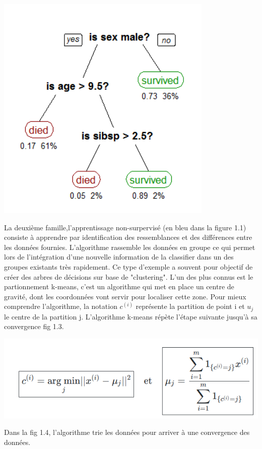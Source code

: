 \documentclass[12pt,a4paper]{report}
\begin{document}
\begin{center}
	\includegraphics[scale=0.5]{ML_superviser}
	\label{fig1}
\end{center}


La deuxième famille,l'apprentissage non-surpervisé (en bleu dans la figure 1.1) consiste à apprendre par identification des ressemblances et des différences entre les données fournies. L'algorithme rassemble les données en groupe ce qui permet lors de l'intégration d'une nouvelle information de la classifier dans un des groupes existants très rapidement. Ce type d'exemple a souvent pour objectif de créer des arbres de décisions sur base de "clustering".
L'un des plus connus est le partionnement k-means, c'est un algorithme qui met en place un centre de gravité, dont les coordonnées vont servir pour localiser cette zone. Pour mieux comprendre l'algorithme, la notation $c^{(i)}$ représente la partition de point i et $u_j$ le centre de la partition j. L'algorithme k-means répète l'étape suivante jusqu'à sa convergence fig 1.3.\\

\begin{center}
	\includegraphics[scale=0.5]{algo_k_means}
	\label{fig1}
\end{center}
\pagebreak
Dans la fig 1.4, l'algorithme trie les données pour arriver à une convergence des données.
\end{document}
